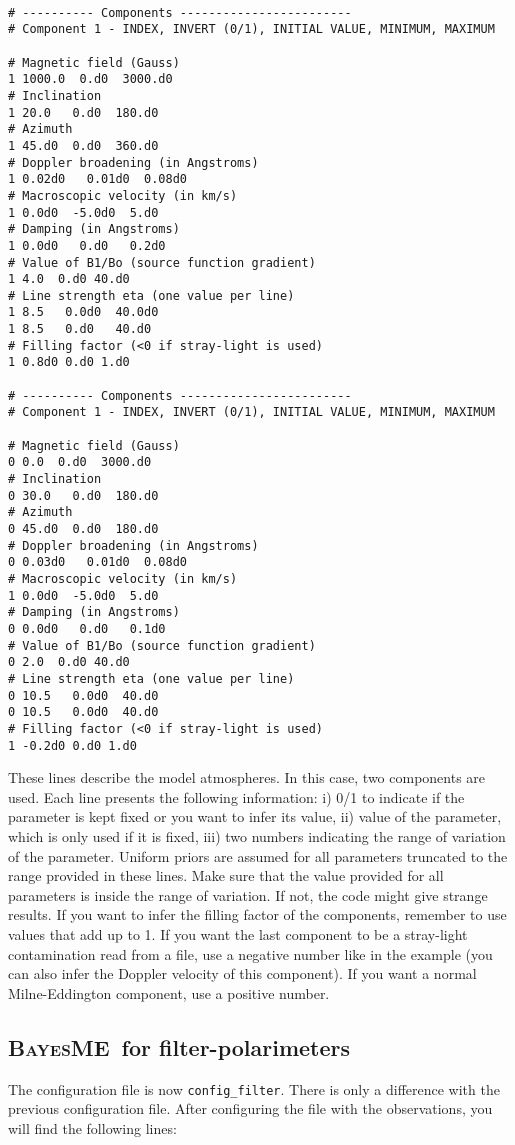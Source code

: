 \documentclass[12pt]{article}
\def\B{\textsc{BayesME}}
\begin{document}
\begin{verbatim}

# ---------- Components ------------------------
# Component 1 - INDEX, INVERT (0/1), INITIAL VALUE, MINIMUM, MAXIMUM

# Magnetic field (Gauss)         
1 1000.0  0.d0  3000.d0
# Inclination 
1 20.0   0.d0  180.d0
# Azimuth
1 45.d0  0.d0  360.d0
# Doppler broadening (in Angstroms) 
1 0.02d0   0.01d0  0.08d0
# Macroscopic velocity (in km/s)
1 0.0d0  -5.0d0  5.d0
# Damping (in Angstroms)
1 0.0d0   0.d0   0.2d0
# Value of B1/Bo (source function gradient)  
1 4.0  0.d0 40.d0
# Line strength eta (one value per line)
1 8.5   0.0d0  40.0d0
1 8.5   0.d0   40.d0
# Filling factor (<0 if stray-light is used)
1 0.8d0 0.d0 1.d0

# ---------- Components ------------------------
# Component 1 - INDEX, INVERT (0/1), INITIAL VALUE, MINIMUM, MAXIMUM

# Magnetic field (Gauss)         
0 0.0  0.d0  3000.d0
# Inclination 
0 30.0   0.d0  180.d0
# Azimuth
0 45.d0  0.d0  180.d0
# Doppler broadening (in Angstroms) 
0 0.03d0   0.01d0  0.08d0
# Macroscopic velocity (in km/s)
1 0.0d0  -5.0d0  5.d0
# Damping (in Angstroms)
0 0.0d0   0.d0   0.1d0
# Value of B1/Bo (source function gradient)  
0 2.0  0.d0 40.d0
# Line strength eta (one value per line)
0 10.5   0.0d0  40.d0
0 10.5   0.0d0  40.d0
# Filling factor (<0 if stray-light is used)
1 -0.2d0 0.d0 1.d0
\end{verbatim}
These lines describe the model atmospheres. In this case, two components are used.
Each line presents the following information: i) 0/1 to indicate if the parameter
is kept fixed or you want to infer its value, ii) value of the parameter, which is
only used if it is fixed, iii) two numbers indicating the range of variation of
the parameter. Uniform priors are assumed for all parameters truncated to the
range provided in these lines. Make sure that the value provided for all parameters
is inside the range of variation. If not, the code might give strange results.
If you want to infer the filling factor of the components, remember to use
values that add up to 1. If you want the last component to be a stray-light
contamination read from a file, use a negative number like in the example (you can
also infer the Doppler velocity of this component). If you want a normal
Milne-Eddington component, use a positive number.

\subsection{\B\ for filter-polarimeters}
The configuration file is now \texttt{config\_filter}. There is
only a difference with the previous configuration file. After configuring
the file with the observations, you will find the following lines:
\end{document}
